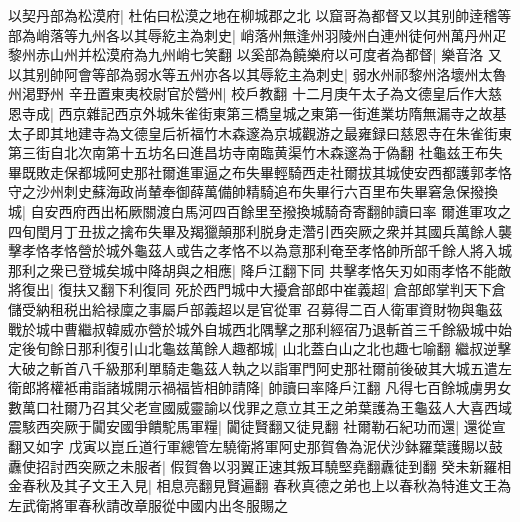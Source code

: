 以契丹部為松漠府|{
	杜佑曰松漠之地在柳城郡之北}
以窟哥為都督又以其别帥逹稽等部為峭落等九州各以其辱紇主為刺史|{
	峭落州無逢州羽陵州白連州徒何州萬丹州疋黎州赤山州并松漠府為九州峭七笑翻}
以奚部為饒樂府以可度者為都督|{
	樂音洛}
又以其别帥阿會等部為弱水等五州亦各以其辱紇主為刺史|{
	弱水州祁黎州洛壞州太魯州渇野州}
辛丑置東夷校尉官於營州|{
	校戶教翻}
十二月庚午太子為文德皇后作大慈恩寺成|{
	西京雜記西京外城朱雀街東第三橋皇城之東第一街進業坊隋無漏寺之故基太子即其地建寺為文德皇后祈福竹木森邃為京城觀游之最雍録曰慈恩寺在朱雀街東第三街自北次南第十五坊名曰進昌坊寺南臨黄渠竹木森邃為于偽翻}
社龜兹王布失畢既敗走保都城阿史那社爾進軍逼之布失畢輕騎西走社爾拔其城使安西都護郭孝恪守之沙州刺史蘇海政尚輦奉御薛萬備帥精騎追布失畢行六百里布失畢窘急保撥換城|{
	自安西府西出柘厥關渡白馬河四百餘里至撥換城騎奇寄翻帥讀曰率}
爾進軍攻之四旬閏月丁丑拔之擒布失畢及羯獵顛那利脱身走濳引西突厥之衆并其國兵萬餘人襲擊孝恪孝恪營於城外龜茲人或告之孝恪不以為意那利奄至孝恪帥所部千餘人將入城那利之衆已登城矣城中降胡與之相應|{
	降戶江翻下同}
共擊孝恪矢刃如雨孝恪不能敵將復出|{
	復扶又翻下利復同}
死於西門城中大擾倉部郎中崔義超|{
	倉部郎掌判天下倉儲受納租税出給禄廩之事屬戶部義超以是官從軍}
召募得二百人衛軍資財物與龜茲戰於城中曹繼叔韓威亦營於城外自城西北隅擊之那利經宿乃退斬首三千餘級城中始定後旬餘日那利復引山北龜兹萬餘人趣都城|{
	山北蓋白山之北也趣七喻翻}
繼叔逆擊大破之斬首八千級那利單騎走龜茲人執之以詣軍門阿史那社爾前後破其大城五遣左衛郎將權袛甫詣諸城開示禍福皆相帥請降|{
	帥讀曰率降戶江翻}
凡得七百餘城虜男女數萬口社爾乃召其父老宣國威靈諭以伐罪之意立其王之弟葉護為王龜茲人大喜西域震駭西突厥于闐安國爭饋駝馬軍糧|{
	闐徒賢翻又徒見翻}
社爾勒石紀功而還|{
	還從宣翻又如字}
戊寅以崑丘道行軍總管左驍衛將軍阿史那賀魯為泥伏沙鉢羅葉護賜以鼓纛使招討西突厥之未服者|{
	假賀魯以羽翼正速其叛耳驍堅堯翻纛徒到翻}
癸未新羅相金春秋及其子文王入見|{
	相息亮翻見賢遍翻}
春秋真德之弟也上以春秋為特進文王為左武衛將軍春秋請改章服從中國内出冬服賜之

